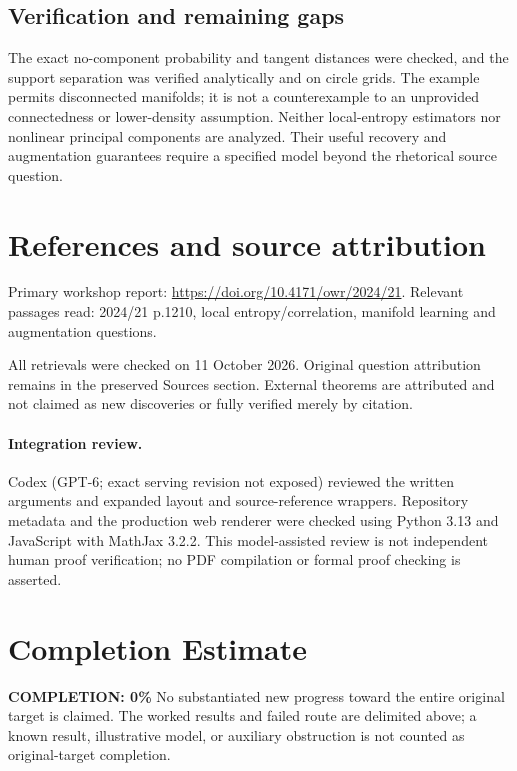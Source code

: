\documentclass[11pt]{article}
\begin{document}
\subsection{Verification and remaining gaps}
The exact no-component probability and tangent distances were checked, and the support separation was verified analytically and on circle grids. The example permits disconnected manifolds; it is not a counterexample to an unprovided connectedness or lower-density assumption. Neither local-entropy estimators nor nonlinear principal components are analyzed. Their useful recovery and augmentation guarantees require a specified model beyond the rhetorical source question.

\section{References and source attribution}
Primary workshop report: \url{https://doi.org/10.4171/owr/2024/21}. Relevant passages read: 2024/21 p.1210, local entropy/correlation, manifold learning and augmentation questions.

All retrievals were checked on 11 October 2026. Original question attribution remains in the preserved Sources section. External theorems are attributed and not claimed as new discoveries or fully verified merely by citation.


\paragraph{Integration review.} Codex (GPT-6; exact serving revision not exposed) reviewed the written arguments and expanded layout and source-reference wrappers. Repository metadata and the production web renderer were checked using Python 3.13 and JavaScript with MathJax 3.2.2. This model-assisted review is not independent human proof verification; no PDF compilation or formal proof checking is asserted.

\section{Completion Estimate}
\noindent\textbf{COMPLETION: 0\%}
No substantiated new progress toward the entire original target is claimed. The worked results and failed route are delimited above; a known result, illustrative model, or auxiliary obstruction is not counted as original-target completion.
\end{document}
